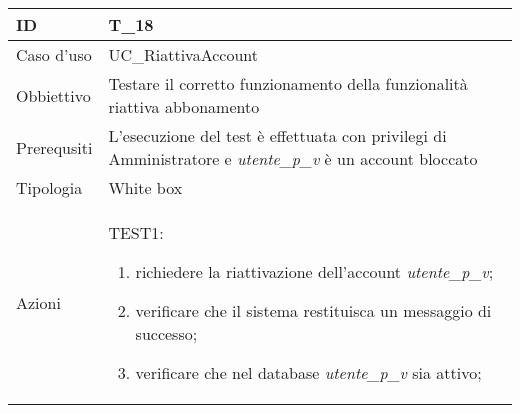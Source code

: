 \begin{table}[hb]
    \centering
    \begin{tabular}{ |p{2cm}|p{10cm}|  }
        \hline
        ID          & T\_18                                                                                                          \\\hline
        Caso d'uso  & UC\_RiattivaAccount                                                                                            \\\hline
        Obbiettivo  & Testare il corretto funzionamento della funzionalità riattiva abbonamento                                      \\\hline
        Prerequsiti & L'esecuzione del test è effettuata con privilegi di Amministratore e \emph{utente\_p\_v} è un account bloccato \\\hline
        Tipologia   & White box                                                                                                      \\\hline
        Azioni      &
        TEST1:
        \begin{enumerate}[nosep, topsep=0pt]
            \item richiedere la riattivazione dell'account \emph{utente\_p\_v};
            \item verificare che il sistema restituisca un messaggio di successo;
            \item verificare che nel database \emph{utente\_p\_v} sia attivo;
        \end{enumerate}
        \\\hline
    \end{tabular}
\end{table}

